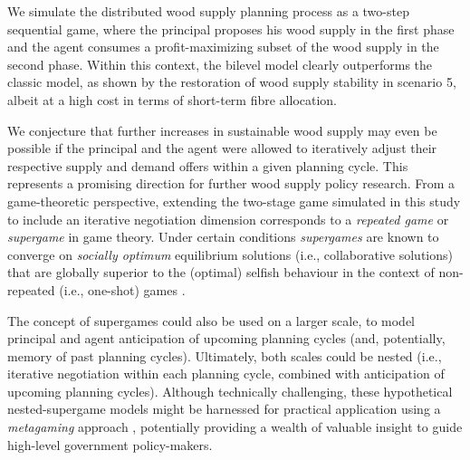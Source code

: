 

We simulate the distributed wood supply planning process as a two-step sequential game, where the principal proposes his wood supply in the first phase and the agent consumes a profit-maximizing subset of the wood supply in the second phase. Within this context, the bilevel model clearly outperforms the classic model, as shown by the restoration of wood supply stability in scenario 5, albeit at a high cost in terms of short-term fibre allocation.

We conjecture that further increases in sustainable wood supply may even be possible if the principal and the agent were allowed to iteratively adjust their respective supply and demand offers within a given planning cycle. This represents a promising direction for further wood supply policy research. From a game-theoretic perspective, extending the two-stage game simulated in this study to include an iterative negotiation dimension corresponds to a \emph{repeated game} or \emph{supergame} in game theory. Under certain conditions \emph{supergames} are known to converge on \emph{socially optimum} equilibrium solutions (i.e., collaborative solutions) that are globally superior to the (optimal) selfish behaviour in the context of non-repeated (i.e., one-shot) games \citep{fudenberg1991game}. 

The concept of supergames could also be used on a larger scale, to model principal and agent anticipation of upcoming planning cycles (and, potentially, memory of past planning cycles). Ultimately, both scales could be nested (i.e., iterative negotiation within each planning cycle, combined with anticipation of upcoming planning cycles). Although technically challenging, these hypothetical nested-supergame models might be harnessed for practical application using a \emph{metagaming} approach \citep{howard1971paradoxes}, potentially providing a wealth of valuable insight to guide high-level government policy-makers.

